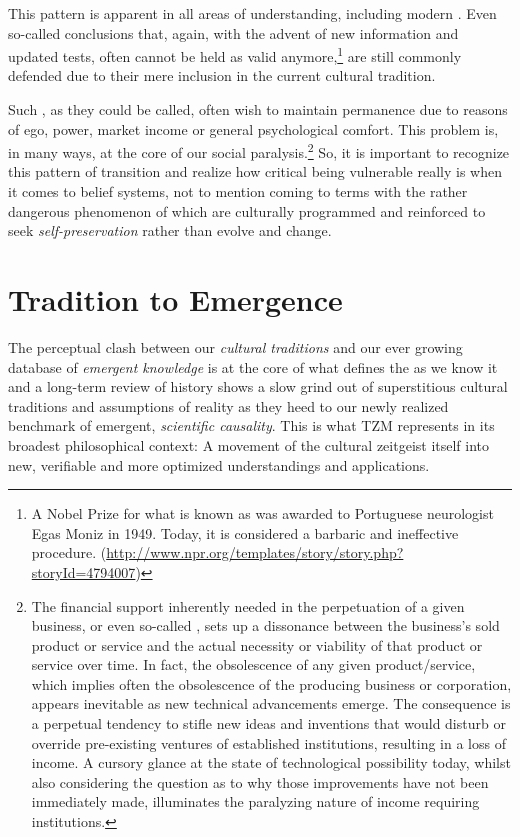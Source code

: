 \documentclass[10pt, a4paper, cleardoubleempty, openright, twoside]{book}
\begin{document}
This pattern is apparent in all areas of understanding, including modern
. Even so-called  conclusions
that, again, with the advent of new information and updated tests, often
cannot be held as valid anymore,\footnote{
	A Nobel Prize for what is known as  was awarded to
	Portuguese neurologist Egas Moniz in 1949. Today, it is considered a
	barbaric and ineffective procedure.
	(\url{http://www.npr.org/templates/story/story.php?storyId=4794007})	
} 
are still commonly defended due to their mere inclusion in the current
cultural tradition.

Such , as they could be called,
often wish to maintain permanence due to reasons of ego, power, market
income or general psychological comfort. This problem is, in many ways,
at the core of our social paralysis.\footnote{
	The financial support inherently needed in the perpetuation of a given
	business,  or even so-called , sets up a dissonance between the business's sold product or
	service and the actual necessity or viability of that product or
	service over time. In fact, the obsolescence of any given
	product/service, which implies often the obsolescence of the producing
	business or corporation, appears inevitable as new technical
	advancements emerge. The consequence is a perpetual tendency to stifle
	new ideas and inventions that would disturb or override pre-existing
	ventures of established institutions, resulting in a loss of income. A
	cursory glance at the state of technological possibility today, whilst
	also considering the question as to why those improvements have not
	been immediately made, illuminates the paralyzing nature of income
	requiring institutions.	
} 
So, it is important to recognize this pattern of transition and realize
how critical being vulnerable really is when it comes to belief systems,
not to mention coming to terms with the rather dangerous phenomenon of
 which are culturally programmed and
reinforced to seek \emph{self-preservation} rather than evolve and
change.

\section {Tradition to Emergence}

The perceptual clash between our \emph{cultural traditions} and our ever
growing database of \emph{emergent knowledge} is at the core of what
defines the  as we know it and a long-term review
of history shows a slow grind out of superstitious cultural traditions
and assumptions of reality as they heed to our newly realized benchmark
of emergent, \emph{scientific causality}. This is what TZM represents in
its broadest philosophical context: A movement of the cultural zeitgeist
itself into new, verifiable and more optimized understandings and
applications.
\end{document}
